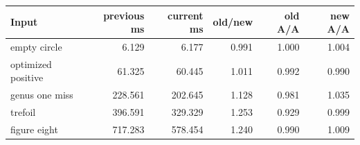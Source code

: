 \begin{center}
\small
\begin{tabular}{lrrrrr}
\toprule
Input & previous ms & current ms & old/new & old A/A & new A/A\\
\midrule
empty circle & 6.129 & 6.177 & 0.991 & 1.000 & 1.004\\
optimized positive & 61.325 & 60.445 & 1.011 & 0.992 & 0.990\\
genus one miss & 228.561 & 202.645 & 1.128 & 0.981 & 1.035\\
trefoil & 396.591 & 329.329 & 1.253 & 0.929 & 0.999\\
figure eight & 717.283 & 578.454 & 1.240 & 0.990 & 1.009\\
\bottomrule
\end{tabular}
\end{center}
